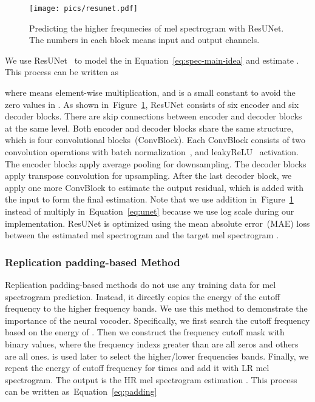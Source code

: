 \documentclass[a4paper]{article}
\def\Figref#1{Figure~\ref{#1}}
\def\Eqref#1{Equation~\ref{#1}}
\begin{document}
\begin{figure}[tbp] \centering
  \vspace{-1.6em}
  \texttt{[image: pics/resunet.pdf]}
  \caption{Predicting the higher frequnecies of mel spectrogram with ResUNet. The numbers in each block means input and output channels.}
  \label{fig-resunet-method}
\end{figure}

We use ResUNet~\cite{kong2021decoupling, liu2021cws} to model the  in \Eqref{eq:spec-main-idea} and estimate . This process can be written as

where  means element-wise multiplication, and  is a small constant to avoid the zero values in . As shown in~\Figref{fig-resunet-method}, ResUNet consists of six encoder and six decoder blocks. There are skip connections between encoder and decoder blocks at the same level. Both encoder and decoder blocks share the same structure, which is four convolutional blocks~(ConvBlock). Each ConvBlock consists of two convolution operations with batch normalization~\cite{ioffe2015batch}, and leakyReLU~\cite{Maas13rectifiernonlinearities} activation. The encoder blocks apply average pooling for downsampling. The decoder blocks apply transpose convolution for upsampling. After the last decoder block, we apply one more ConvBlock to estimate the output residual, which is added with the input to form the final estimation. Note that we use addition in~\Figref{fig-resunet-method} instead of multiply in~\Eqref{eq:unet} because we use log scale during our implementation.
ResUNet is optimized using the mean absolute error~(MAE) loss between the estimated mel spectrogram  and the target mel spectrogram .



\subsubsection{Replication padding-based Method}
\label{sec:statical-method}

Replication padding-based methods do not use any training data for mel spectrogram prediction. Instead, it directly copies the energy of the cutoff frequency to the higher frequency bands. We use this method to demonstrate the importance of the neural vocoder. 
Specifically, we first search the cutoff frequency  based on the energy of . Then we construct the frequency cutoff mask  with binary values, where the frequency indexs greater than  are all zeros and others are all ones.  is used later to select the higher/lower frequencies bands. 
Finally, we repeat the energy of cutoff frequency for  times and add it with LR mel spectrogram. The output is the HR mel spectrogram estimation . This process can be written as~\Eqref{eq:padding}
\end{document}
